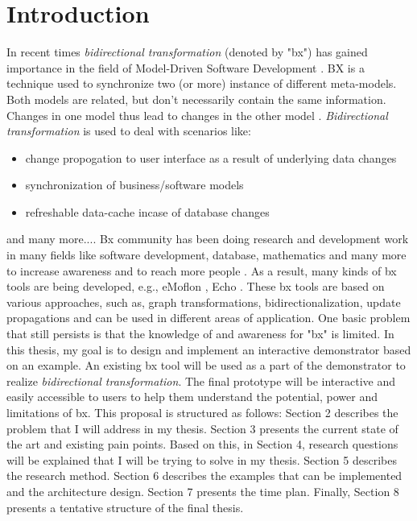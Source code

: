 \section{Introduction}\label{sec:introduction}
In recent times \textit{bidirectional transformation} (denoted by "bx") has gained importance in the field of Model-Driven Software Development \cite{bx-grace} \cite{bx-dagstuhl}. BX is a technique used to synchronize two (or more) instance of different meta-models. Both models are related, but don't necessarily contain the same information. Changes in one model thus lead to changes in the other model \cite{bx-grace}. 
\newline\newline\textit{Bidirectional transformation} is used to deal with scenarios like:
\begin{itemize}
	\item {change propogation to user interface as a result of underlying data changes}	
	\item {synchronization of business/software models}
	\item {refreshable data-cache incase of database changes}
\end{itemize}
    and many more....
\newline\newline Bx community has been doing research and development work in many fields like software development, database, mathematics and many more to increase awareness and to reach more people \cite{bx-dagstuhl}\cite{bx-grace}. As a result, many kinds of bx tools are being developed, e.g., eMoflon \cite{emoflon-part4}, Echo \cite{echo}. These bx tools are based on various approaches, such as, graph transformations, bidirectionalization, update propagations \cite{bx-community} and can be used in different areas of application.
\newline\newline One basic problem that still persists is that the knowledge of and awareness for "bx" is limited. In this thesis, my goal is to design and implement an interactive demonstrator based on an example. An existing bx tool will be used as a part of the demonstrator to realize \textit{bidirectional transformation}. The final prototype will be interactive and easily accessible to users to help them understand the potential, power and limitations of bx.
\newline\newline This proposal is structured as follows: Section 2 describes the problem that I will address in my thesis. Section 3 presents the current state of the art and existing pain points. Based on this, in Section 4, research questions will be explained that I will be trying to solve in my thesis. Section 5 describes the research method. Section 6 describes the examples that can be implemented and the architecture design. Section 7 presents the time plan. Finally, Section 8 presents a tentative structure of the final thesis.


